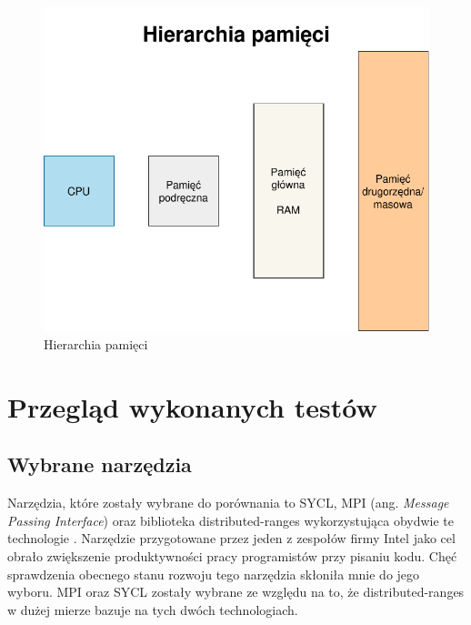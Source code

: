 \documentclass[a4paper,12pt]{book} %
\begin{document}
\begin{figure}[h]
	\centering
	\includegraphics[scale=0.9]{assets/hierarchia_pamieci.pdf}
	\caption{Hierarchia pamięci}
	\label{hierarchia_pamieci}
\end{figure}

\chapter{Przegląd wykonanych testów}
\section{Wybrane narzędzia}
Narzędzia, które zostały wybrane do porównania to SYCL, MPI (ang. \emph{Message Passing Interface}) oraz biblioteka distributed-ranges wykorzystująca obydwie te technologie \cite{SYCL, MPI, dist-ranges}. Narzędzie przygotowane przez jeden z zespołów firmy Intel jako cel obrało zwiększenie produktywności pracy programistów przy pisaniu kodu. Chęć sprawdzenia obecnego stanu rozwoju tego narzędzia skłoniła mnie do jego wyboru. MPI oraz SYCL zostały wybrane ze względu na to, że distributed-ranges w dużej mierze bazuje na tych dwóch technologiach.
\end{document}
